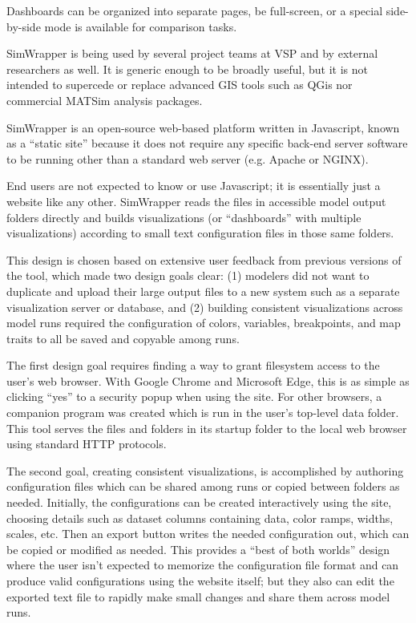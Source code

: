 \documentclass[3p,times,procedia]{elsarticle}
\begin{document}
Dashboards can be organized into separate pages, be full-screen, or a special side-by-side mode is available for comparison tasks.

SimWrapper is being used by several project teams at VSP and by external researchers as well. It is generic enough to be broadly useful, but it is not intended to supercede or replace advanced GIS tools such as QGis nor commercial MATSim analysis packages.

SimWrapper is an open-source web-based platform written in Javascript, known as a “static site” because it does not require any specific back-end server software to be running other than a standard web server (e.g. Apache or NGINX).

End users are not expected to know or use Javascript; it is essentially just a website like any other. SimWrapper reads the files in accessible model output folders directly and builds visualizations (or “dashboards” with multiple visualizations) according to small text configuration files in those same folders.

This design is chosen based on extensive user feedback from previous versions of the tool, which made two design goals clear: (1) modelers did not want to duplicate and upload their large output files to a new system such as a separate visualization server or database, and (2) building consistent visualizations across model runs required the configuration of colors, variables, breakpoints, and map traits to all be saved and copyable among runs.

The first design goal requires finding a way to grant filesystem access to the user’s web browser. With Google Chrome and Microsoft Edge, this is as simple as clicking “yes” to a security popup when using the site. For other browsers, a companion program was created which is run in the user’s top-level data folder. This tool serves the files and folders in its startup folder to the local web browser using standard HTTP protocols.

The second goal, creating consistent visualizations, is accomplished by authoring configuration files which can be shared among runs or copied between folders as needed. Initially, the configurations can be created interactively using the site, choosing details such as dataset columns containing data, color ramps, widths, scales, etc. Then an export button writes the needed configuration out, which can be copied or modified as needed. This provides a “best of both worlds” design where the user isn’t expected to memorize the configuration file format and can produce valid configurations using the website itself; but they also can edit the exported text file to rapidly make small changes and share them across model runs.
\end{document}
